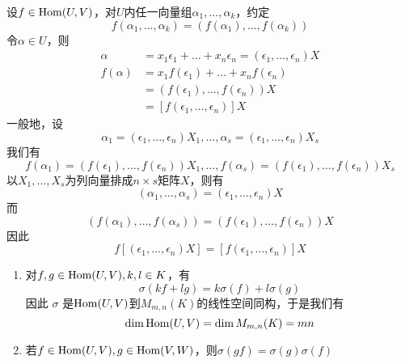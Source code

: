 \documentclass[11pt]{article}
\begin{document}
设\(f\in\operatorname{Hom}(U,V)\)，对\(U\)内任一向量组\(\alpha_1,\dots,\alpha_k\)，约定
\begin{equation*}
f(\alpha_1,\dots,\alpha_k)=(f(\alpha_1),\dots,f(\alpha_k))
\end{equation*}
令\(\alpha\in U\)，则
\begin{align*}
\alpha&=x_1\epsilon_1+\dots+x_n\epsilon_n=(\epsilon_1,\dots,\epsilon_n)X\\
f(\alpha)   &=x_1f(\epsilon_1)+\dots+x_nf(\epsilon_n)\\
&=(f(\epsilon_1),\dots,f(\epsilon_n))X\\
&=[f(\epsilon_1,\dots,\epsilon_n)]X
\end{align*}
一般地，设
\begin{equation*}
\alpha_1=(\epsilon_1,\dots,\epsilon_n)X_1,\dots,\alpha_s=
(\epsilon_1,\dots,\epsilon_n)X_s
\end{equation*}
我们有
\begin{equation*}
f(\alpha_1)=(f(\epsilon_1),\dots,f(\epsilon_n))X_1,\dots,
f(\alpha_s)=(f(\epsilon_1),\dots,f(\epsilon_n))X_s
\end{equation*}
以\(X_1,\dots,X_s\)为列向量排成\(n\times s\)矩阵\(X\)，则有
\begin{equation*}
(\alpha_1,\dots,\alpha_s)=(\epsilon_1,\dots,\epsilon_n)X
\end{equation*}
而
\begin{equation*}
(f(\alpha_1),\dots,f(\alpha_s))=(f(\epsilon_1),\dots,f(\epsilon_n))X
\end{equation*}
因此
\begin{equation*}
f[(\epsilon_1,\dots,\epsilon_n)X]=[f(\epsilon_1,\dots,\epsilon_n)]X
\end{equation*}

\begin{proposition}[]
\begin{enumerate}
\item 对\(f,g\in\operatorname{Hom}(U,V),k,l\in K\)，有
\begin{equation*}
\sigma(kf+lg)=k\sigma(f)+l\sigma(g)
\end{equation*}
因此 \(\sigma\) 是\(\operatorname{Hom}(U,V)\)到\(M_{m,n}(K)\)的线性空间同构，于是我们有
\begin{equation*}
\dim\operatorname{Hom}(U,V)=\dim M_{m,n}(K)=mn
\end{equation*}
\item 若\(f\in\operatorname{Hom}(U,V),g\in\operatorname{Hom}(V,W)\)，则\(\sigma(gf)=\sigma(g)\sigma(f)\)
\end{enumerate}
\end{proposition}
\end{document}
